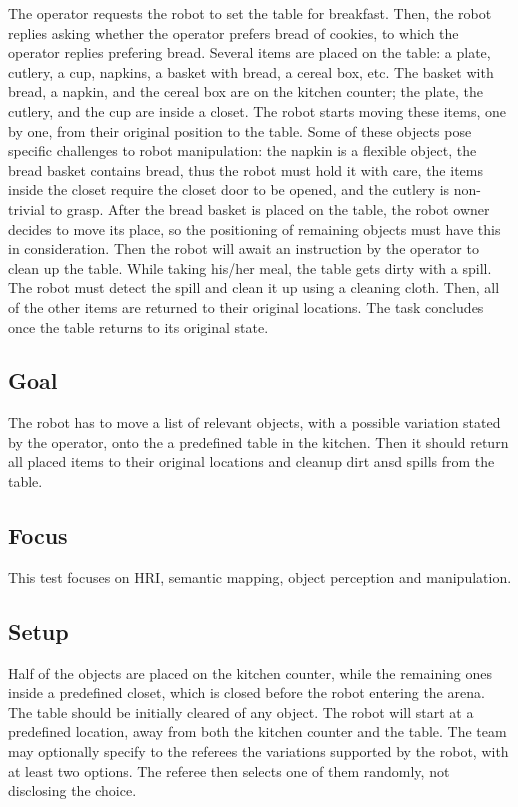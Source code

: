 The operator requests the robot to set the table for breakfast. Then, the robot replies asking whether the operator prefers bread of cookies, to which the operator replies prefering bread.  Several items are placed on the table: a plate, cutlery, a cup, napkins, a basket with bread, a cereal box, etc. The basket with bread, a napkin, and the cereal box are on the kitchen counter; the plate, the cutlery, and the cup are inside a closet. The robot starts moving these items, one by one, from their original position to the table. Some of these objects pose specific challenges to robot manipulation: the napkin is a flexible object, the bread basket contains bread, thus the robot must hold it with care, the items inside the closet require the closet door to be opened, and the cutlery is non-trivial to grasp. After the bread basket is placed on the table, the robot owner decides to move its place, so the positioning of remaining objects must have this in consideration. Then the robot will await an instruction by the operator to clean up the table. While taking his/her meal, the table gets dirty with a spill. The robot must detect the spill and clean it up using a cleaning cloth. Then, all of the other items are returned to their original locations. The task concludes once the table returns to its original state.

\subsection{Goal}

The robot has to move a list of relevant objects, with a possible variation stated by the operator, onto the a predefined table in the kitchen. Then it should return all placed items to their original locations and cleanup dirt ansd spills from the table.

\subsection{Focus}

This test focuses on HRI, semantic mapping, object perception and manipulation.

\subsection{Setup}

Half of the objects are placed on the kitchen counter, while the remaining ones inside a predefined closet, which is closed before the robot entering the arena. The table should be initially cleared of any object. The robot will start at a predefined location, away from both the kitchen counter and the table. The team may optionally specify to the referees the variations supported by the robot, with at least two options. The referee then selects one of them randomly, not disclosing the choice.

